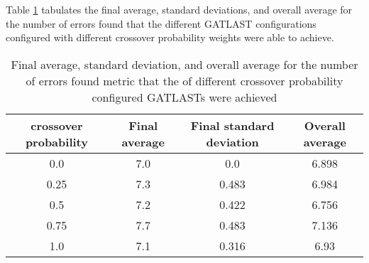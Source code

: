 Table \ref{tab:HP:GA:crossoverProp:number of errors found} tabulates the final average, standard deviations, and overall average for the number of errors found that the different GATLAST configurations configured with different crossover probability weights were able to achieve.
\begin{table}[tbh!]
\centering
\begin{adjustbox}{trim=0cm 0cm 0cm 0cm, clip=true}
\begin{tabular}{|c|c|c|c|}
\hline
crossover probability & Final average & Final standard deviation & Overall average\\
\hline
0.0 & 7.0 & 0.0 & 6.898\\\hline
0.25 & 7.3 & 0.483 & 6.984\\\hline
0.5 & 7.2 & 0.422 & 6.756\\\hline
0.75 & 7.7 & 0.483 & 7.136\\\hline
1.0 & 7.1 & 0.316 & 6.93\\\hline
\end{tabular}
\end{adjustbox}
\caption{Final average, standard deviation, and overall average for the number of errors found metric that the of different crossover probability configured GATLASTs were achieved}
\label{tab:HP:GA:crossoverProp:number of errors found}
\end{table}